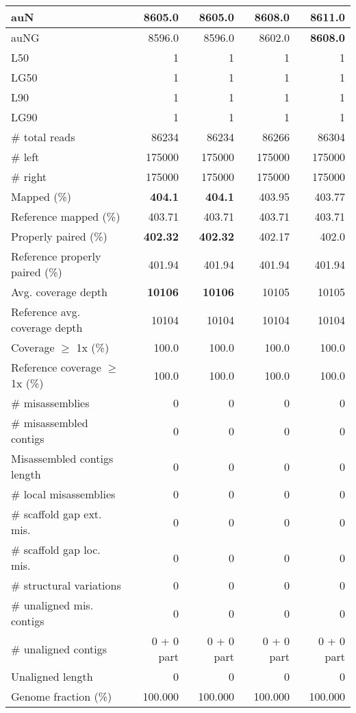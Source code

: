 \documentclass[12pt,a4paper]{article}
\begin{document}
\begin{table}[ht]
\begin{center}
\begin{tabular}{|l*{4}{|r}|}
auN & 8605.0 & 8605.0 & 8608.0 & {\bf 8611.0} \\ \hline
auNG & 8596.0 & 8596.0 & 8602.0 & {\bf 8608.0} \\ \hline
L50 & 1 & 1 & 1 & 1 \\ \hline
LG50 & 1 & 1 & 1 & 1 \\ \hline
L90 & 1 & 1 & 1 & 1 \\ \hline
LG90 & 1 & 1 & 1 & 1 \\ \hline
\# total reads & 86234 & 86234 & 86266 & 86304 \\ \hline
\# left & 175000 & 175000 & 175000 & 175000 \\ \hline
\# right & 175000 & 175000 & 175000 & 175000 \\ \hline
Mapped (\%) & {\bf 404.1} & {\bf 404.1} & 403.95 & 403.77 \\ \hline
Reference mapped (\%) & 403.71 & 403.71 & 403.71 & 403.71 \\ \hline
Properly paired (\%) & {\bf 402.32} & {\bf 402.32} & 402.17 & 402.0 \\ \hline
Reference properly paired (\%) & 401.94 & 401.94 & 401.94 & 401.94 \\ \hline
Avg. coverage depth & {\bf 10106} & {\bf 10106} & 10105 & 10105 \\ \hline
Reference avg. coverage depth & 10104 & 10104 & 10104 & 10104 \\ \hline
Coverage $\geq$ 1x (\%) & 100.0 & 100.0 & 100.0 & 100.0 \\ \hline
Reference coverage $\geq$ 1x (\%) & 100.0 & 100.0 & 100.0 & 100.0 \\ \hline
\# misassemblies & 0 & 0 & 0 & 0 \\ \hline
\# misassembled contigs & 0 & 0 & 0 & 0 \\ \hline
Misassembled contigs length & 0 & 0 & 0 & 0 \\ \hline
\# local misassemblies & 0 & 0 & 0 & 0 \\ \hline
\# scaffold gap ext. mis. & 0 & 0 & 0 & 0 \\ \hline
\# scaffold gap loc. mis. & 0 & 0 & 0 & 0 \\ \hline
\# structural variations & 0 & 0 & 0 & 0 \\ \hline
\# unaligned mis. contigs & 0 & 0 & 0 & 0 \\ \hline
\# unaligned contigs & 0 + 0 part & 0 + 0 part & 0 + 0 part & 0 + 0 part \\ \hline
Unaligned length & 0 & 0 & 0 & 0 \\ \hline
Genome fraction (\%) & 100.000 & 100.000 & 100.000 & 100.000 \\ \hline

\end{tabular}
\end{center}
\end{table}
\end{document}
